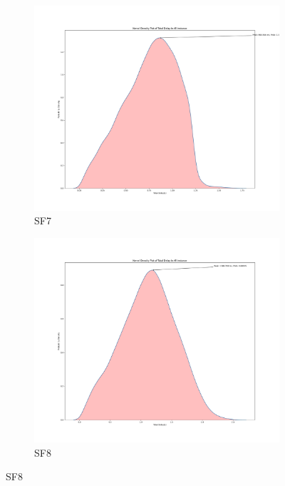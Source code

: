 \begin{figure}[htp!]
    \centering
    \begin{subfigure}{0.45\linewidth}
        \includegraphics[width=\linewidth]{images/Total Delay density1.png}
        \caption{SF7}
    \end{subfigure}
    \hfill
    \begin{subfigure}{0.45\linewidth}
        \includegraphics[width=\linewidth]{images/Total Delay density2.png}
        \caption{SF8}
    \end{subfigure}

\end{figure}
